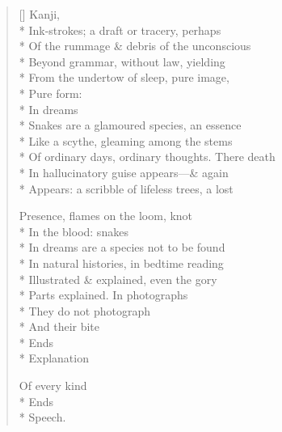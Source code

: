 \begin{verse}[\versewidth]
\hspace{4\vgap} Kanji, \\*
Ink-strokes; a draft or tracery, perhaps\\*
Of the rummage \& debris of the unconscious\\*
Beyond grammar, without law, yielding\\*
From the undertow of sleep, pure image, \\*
Pure form:\\*
\hspace{3\vgap} In dreams\\*
Snakes are a glamoured species, an essence\\*
Like a scythe, gleaming among the stems\\*
Of ordinary days, ordinary thoughts.  There death\\*
In hallucinatory guise appears---\& again\\*
Appears: a scribble of lifeless trees, a lost

Presence, flames on the loom, knot \\*
In the blood: snakes\\*
In dreams are a species not to be found\\*
In natural histories, in bedtime reading\\*
Illustrated \& explained, even the gory \\*
Parts explained.   In photographs\\*
They do not photograph\\*
And their bite\\*
Ends\\*
Explanation

Of every kind\\*
Ends\\*
Speech.
\end{verse}
